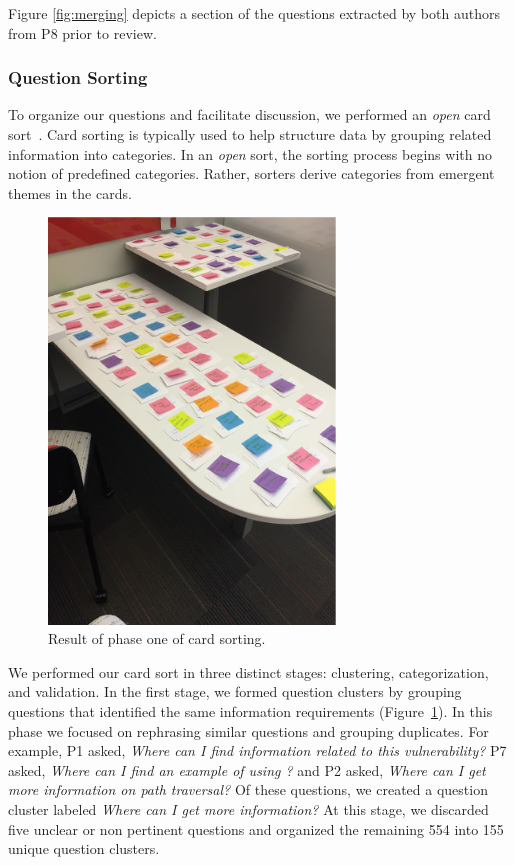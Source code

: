 \documentclass[conference]{IEEEtran}
\begin{document}
Figure \ref{fig:merging} depicts a section of the questions extracted by both authors from P8 prior to review.

\subsubsection{Question Sorting}
To organize our questions and facilitate discussion, we performed an \textit{open} card sort~\cite{hudson2013sorting}. 
Card sorting is typically used to help structure data by grouping related information into categories. 
In an \textit{open} sort, the sorting process begins with no notion of predefined categories. 
Rather, sorters derive categories from emergent themes in the cards. 

\begin{figure}
\centering
\includegraphics[width=3in]{Images/notecards.pdf}
\caption{Result of phase one of card sorting.}
\label{fig:stageOne} 
\end{figure}

We performed our card sort in three distinct stages: clustering, categorization, and validation.
In the first stage, we formed question clusters by grouping questions that identified the same information requirements (Figure~\ref{fig:stageOne}). 
In this phase we focused on rephrasing similar questions and grouping duplicates.
For example, P1 asked, \textit{Where can I find information related to this vulnerability?} P7 asked, \textit{Where can I find an example of using ?} and P2 asked, \textit{Where can I get more information on path traversal?} 
Of these questions, we created a question cluster labeled \textit{Where can I get more information?}
At this stage, we discarded five unclear or non pertinent questions and organized the remaining 554 into 155 unique question clusters.
\end{document}

